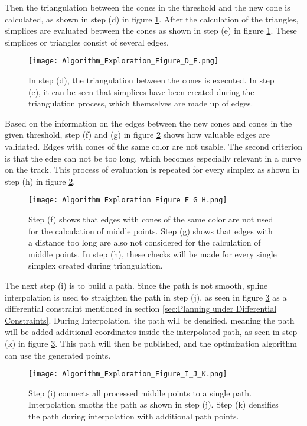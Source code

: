 Then the triangulation between the cones in the threshold and the new cone is calculated, as shown in step (d) in figure \ref{fig:Algorithm Exploration Figure D and E}. After the calculation of the triangles, simplices are evaluated between the cones as shown in step (e) in figure \ref{fig:Algorithm Exploration Figure D and E}. These simplices or triangles consist of several edges.
\begin{figure}[H]
    \centering
    \texttt{[image: Algorithm\_Exploration\_Figure\_D\_E.png]}
    \caption{In step (d), the triangulation between the cones is executed. In step (e), it can be seen that simplices have been created during the triangulation process, which themselves are made up of edges.}
    \label{fig:Algorithm Exploration Figure D and E}
\end{figure}

Based on the information on the edges between the new cones and cones in the given threshold, step (f) and (g) in figure \ref{fig:Algorithm Exploration Figure F, G and H} shows how valuable edges are validated. Edges with cones of the same color are not usable. The second criterion is that the edge can not be too long, which becomes especially relevant in a curve on the track. This process of evaluation is repeated for every simplex as shown in step (h) in figure \ref{fig:Algorithm Exploration Figure F, G and H}.
\begin{figure}[H]
    \centering
    \texttt{[image: Algorithm\_Exploration\_Figure\_F\_G\_H.png]}
    \caption{Step (f) shows that edges with cones of the same color are not used for the calculation of middle points. Step (g) shows that edges with a distance too long are also not considered for the calculation of middle points. In step (h), these checks will be made for every single simplex created during triangulation.}
    \label{fig:Algorithm Exploration Figure F, G and H}
\end{figure}

The next step (i) is to build a path. Since the path is not smooth, spline interpolation is used to straighten the path in step (j), as seen in figure \ref{fig:Algorithm Exploration Figure I, J and K} as a differential constraint mentioned in section \ref{sec:Planning under Differential Constraints}. During Interpolation, the path will be densified, meaning the path will be added additional coordinates inside the interpolated path, as seen in step (k) in figure \ref{fig:Algorithm Exploration Figure I, J and K}. This path will then be published, and the optimization algorithm can use the generated points.
\begin{figure}[H]
    \centering
    \texttt{[image: Algorithm\_Exploration\_Figure\_I\_J\_K.png]}
    \caption{Step (i) connects all processed middle points to a single path. Interpolation smoths the path as shown in step (j). Step (k) densifies the path during interpolation with additional path points.}
    \label{fig:Algorithm Exploration Figure I, J and K}
\end{figure}

